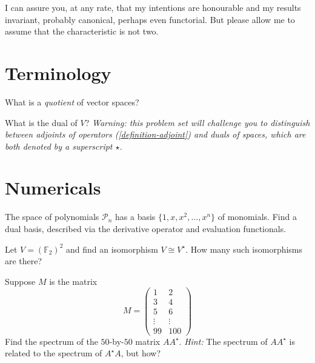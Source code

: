 \documentclass{homework}
\author{Jim Fowler}
\begin{document}
\maketitle

\begin{inspiration}
  I can assure you, at any rate, that my intentions are honourable and
  my results invariant, probably canonical, perhaps even
  functorial. But please allow me to assume that the characteristic is
  not two.
\end{inspiration}

\section{Terminology}

\begin{problem}
  What is a \textit{quotient} of vector spaces?
\end{problem}

\begin{problem}
  What is the dual of $V$?  \textit{Warning: this problem set will
    challenge you to distinguish between adjoints of operators
    (\ref{definition-adjoint}) and duals of spaces, which are both
    denoted by a superscript $\star$.}
\end{problem}

\section{Numericals}

\begin{problem}
  The space of polynomials $\mathcal{P}_n$ has a basis
  $\{1,x,x^2,\ldots,x^n\}$ of monomials.  Find a dual basis, described
  via the derivative operator and evaluation functionals.
\end{problem}

\begin{problem}\label{f2-isomorphism-count}
  Let $V = \left(\mathbb{F}_2\right)^2$ and find an isomorphism
  $V \cong V^\star$.  How many such isomorphisms are there?
\end{problem}

\begin{problem}
  Suppose $M$ is the matrix
  \[
    M = \begin{pmatrix} 1 & 2 \\
      3 & 4 \\
      5 & 6 \\
      \vdots & \vdots \\
      99 & 100
      \end{pmatrix}
    \]
    Find the spectrum of the $50$-by-$50$ matrix $AA^\star$.  \textit{Hint:} The spectrum of $AA^\star$ is related to the spectrum of $A^\star A$, but how?
  \end{problem}
\end{document}
